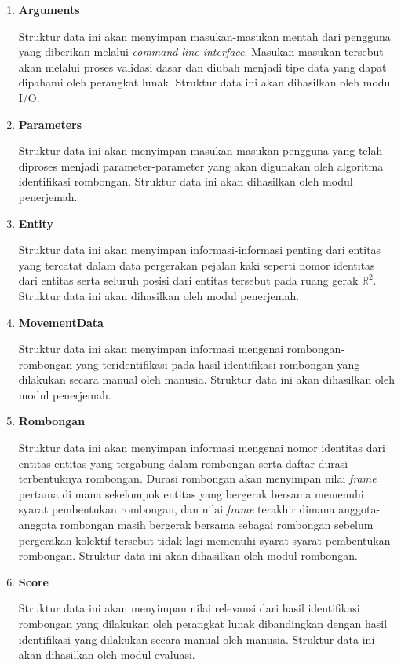 \begin{enumerate}
    \item \textbf{Arguments}
    
    Struktur data ini akan menyimpan masukan-masukan mentah dari pengguna yang diberikan melalui \textit{command line interface}. Masukan-masukan tersebut akan melalui proses validasi dasar dan diubah menjadi tipe data yang dapat dipahami oleh perangkat lunak. Struktur data ini akan dihasilkan oleh modul I/O.
    
    \item \textbf{Parameters}
    
    Struktur data ini akan menyimpan masukan-masukan pengguna yang telah diproses menjadi parameter-parameter yang akan digunakan oleh algoritma identifikasi rombongan. Struktur data ini akan dihasilkan oleh modul penerjemah.
    
    \item \textbf{Entity}
    
    Struktur data ini akan menyimpan informasi-informasi penting dari entitas yang tercatat dalam data pergerakan pejalan kaki seperti nomor identitas dari entitas serta seluruh posisi dari entitas tersebut pada ruang gerak $\mathbb{R}^2$. Struktur data ini akan dihasilkan oleh modul penerjemah.
    
    \item \textbf{MovementData}
    
    Struktur data ini akan menyimpan informasi mengenai rombongan-rombongan yang teridentifikasi pada hasil identifikasi rombongan yang dilakukan secara manual oleh manusia. Struktur data ini akan dihasilkan oleh modul penerjemah.
    
    \item \textbf{Rombongan}
    
    Struktur data ini akan menyimpan informasi mengenai nomor identitas dari entitas-entitas yang tergabung dalam rombongan serta daftar durasi terbentuknya rombongan. Durasi rombongan akan menyimpan nilai \textit{frame} pertama di mana sekelompok entitas yang bergerak bersama memenuhi syarat pembentukan rombongan, dan nilai \textit{frame} terakhir dimana anggota-anggota rombongan masih bergerak bersama sebagai rombongan sebelum pergerakan kolektif tersebut tidak lagi memenuhi syarat-syarat pembentukan rombongan. Struktur data ini akan dihasilkan oleh modul rombongan.
    
    \item \textbf{Score}
    
    Struktur data ini akan menyimpan nilai relevansi dari hasil identifikasi rombongan yang dilakukan oleh perangkat lunak dibandingkan dengan hasil identifikasi yang dilakukan secara manual oleh manusia. Struktur data ini akan dihasilkan oleh modul evaluasi.
\end{enumerate}